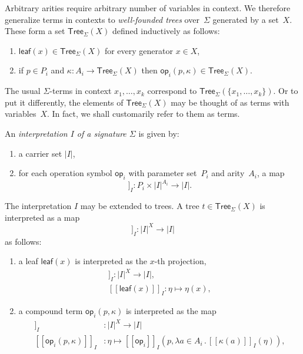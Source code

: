 \documentclass{amsart}
\newcommand{\carrier}[1]{|#1|} %
\newcommand{\set}[1]{\{#1\}} %
\newcommand{\lam}[1]{\lambda #1 \,.\,}
\newcommand{\Tree}[2]{\mathsf{Tree}_{#1}(#2)} %
\newcommand{\leaf}[1]{\mathsf{leaf}(#1)} %
\newcommand{\op}[1]{\mathsf{op}_{#1}} %
\newcommand{\sem}[1]{[\![#1]\!]} %
\begin{document}
Arbitrary arities require arbitrary number of variables in context. We therefore
generalize terms in contexts to \emph{well-founded trees} over~$\Sigma$
generated by a set~$X$. These form a set $\Tree{\Sigma}{X}$ defined inductively
as follows:
%
\begin{enumerate}
\item $\leaf{x} \in \Tree{\Sigma}{X}$ for every generator $x \in X$,
\item if $p \in P_i$ and $\kappa : A_i \to \Tree{\Sigma}{X}$ then
  $\op{i}(p, \kappa) \in \Tree{\Sigma}{X}$.
\end{enumerate}
%
The usual $\Sigma$-terms in context $x_1, \ldots, x_k$ correspond to
$\Tree{\Sigma}{\set{x_1, \ldots, x_k}}$. Or to put it differently, the elements
of $\Tree{\Sigma}{X}$ may be thought of as terms with variables~$X$. In fact, we
shall customarily refer to them as terms.

An \emph{interpretation $I$ of a signature $\Sigma$} is given by:
%
\begin{enumerate}
\item a carrier set $\carrier{I}$,
\item for each operation symbol $\op{i}$ with parameter set~$P_i$ and arity~$A_i$,
  a map
  \begin{equation*}
    \sem{\op{i}}_I : P_i \times \carrier{I}^{A_i} \longrightarrow \carrier{I}.
  \end{equation*}
\end{enumerate}
%
The interpretation $I$ may be extended to trees. A tree $t \in \Tree{\Sigma}{X}$
is interpreted as a map
%
\begin{equation*}
  \sem{t}_I : \carrier{I}^X \to \carrier{I}
\end{equation*}
%
as follows:
%
\begin{enumerate}
\item a leaf $\leaf{x}$ is interpreted as the $x$-th projection,
  \begin{align*}
    \sem{\leaf{x}}_I : \carrier{I}^X \to \carrier{I},\\
    \sem{\leaf{x}}_I : \eta \mapsto \eta(x),
  \end{align*}
\item a compound term $\op{i}(p, \kappa)$ is interpreted as the map
  \begin{align*}
    \sem{\op{i}(p, \kappa)}_I &: \carrier{I}^X \longrightarrow \carrier{I} \\
    \sem{\op{i}(p, \kappa)}_I &:
      \eta \mapsto
      \sem{\op{i}}_I(p, \lam{a \in A_i} \sem{\kappa(a)}_I(\eta)),
  \end{align*}
\end{enumerate}
\end{document}
